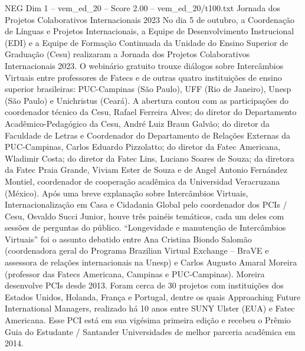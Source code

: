 \begin{textsample}{NEG Dim 1 – vem\_ed\_20 – Score 2.00 – vem\_ed\_20/t100.txt}  \label{ex:f1_neg_072}
Jornada dos Projetos Colaborativos Internacionais 2023 No dia 5 de outubro, a Coordenação de Línguas e Projetos Internacionais, a Equipe de Desenvolvimento Instrucional (EDI) e a Equipe de Formação Continuada da Unidade do Ensino Superior de Graduação (Cesu) realizaram a Jornada dos Projetos Colaborativos Internacionais 2023.
O webinário gratuito trouxe diálogos sobre Intercâmbios Virtuais entre professores de Fatecs e de outras quatro instituições de ensino superior brasileiras: PUC-Campinas (São Paulo), UFF (Rio de Janeiro), Unesp (São Paulo) e Unichristus (Ceará).
A abertura contou com as participações do coordenador técnico da Cesu, Rafael Ferreira Alves; do diretor do Departamento Acadêmico-Pedagógico da Cesu, André Luiz Braun Galvão; do diretor da Faculdade de Letras e Coordenador do Departamento de Relações Externas da PUC-Campinas, Carlos Eduardo Pizzolatto; do diretor da Fatec Americana, Wladimir Costa; do diretor da Fatec Lins, Luciano Soares de Souza; da diretora da Fatec Praia Grande, Viviam Ester de Souza e de Angel Antonio Fernández Montiel, coordenador de cooperação acadêmica da Universidad Veracruzana (México).
Após uma breve explanação sobre Intercâmbios Virtuais, Internacionalização em Casa e Cidadania Global pelo coordenador dos PCIs / Cesu, Osvaldo Succi Junior, houve três painéis temáticos, cada um deles com sessões de perguntas do público. “Longevidade e manutenção de Intercâmbios Virtuais” foi o assunto debatido entre Ana Cristina Biondo Salomão (coordenadora geral do Programa Brazilian Virtual Exchange – BraVE e assessora de relações internacionais na Unesp) e Carlos Augusto Amaral Moreira (professor das Fatecs Americana, Campinas e PUC-Campinas).
Moreira desenvolve PCIs desde 2013.
Foram cerca de 30 projetos com instituições dos Estados Unidos, Holanda, França e Portugal, dentre os quais Approaching Future International Managers, realizado há 10 anos entre SUNY Ulster (EUA) e Fatec Americana.
Esse PCI está em sua vigésima primeira edição e recebeu o Prêmio Guia do Estudante / Santander Universidades de melhor parceria acadêmica em 2014.

\end{textsample}
